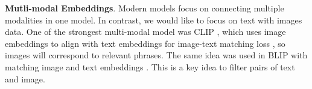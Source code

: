 \documentclass[11pt]{article}
\begin{document}
\textbf{Mutli-modal Embeddings}. Modern models \cite{GATO,kosmos-1,flamingo} focus on connecting multiple modalities in one model. In contrast, we would like to focus on text with images data. One of the strongest multi-modal model was CLIP \cite{Radford-2021}, which uses image embeddings to align with text embeddings for image-text matching loss \cite{contrastive-loss}, so images will correspond to relevant phrases. The same idea was used in BLIP \cite{blip} with matching image and text embeddings \cite{ALBEF}. This is a key idea to filter pairs of text and image.%
\begin{comment}
One of the first multi-modal model was the VisualBERT \cite{vis-bert}, which combines the transformer-based language model with a vision encoder to capture the textual and visual information jointly. Similarly, the LXMERT model \cite{lxmert} incorporates a language encoder and a vision encoder, which can perform joint multi-modal learning on large-scale datasets. The most recent models, such as GATO \cite{GATO}, Kosmos-1 \cite{kosmos-1} are incorporating visual information with passing image through encoder that outputs an embedding that is a great source of information for language model. The same approach was also applied with recent work \cite{mm_chat}, which concatenated dialogue context embedding from GPT \cite{gpt} and image embeddings from Faster-RCNN \cite{faster-rcnn} and pass them to GPT decoder. On the other hand, there is a Flamingo \cite{flamingo}, that uses image information not just as embedding passed to language model, but learns perciever block\cite{perciever} between image information and language model, and then passes this information to language model with cross-attention mechanism. BLIP2 \cite{blip2} connects these approaches and uses special block to transform visual embedding and then pass it to the language model input. 

\smallskip

Nevertheless, those models focus on connecting multiple modalities in one model. In contrast, we would like to focus on text with images data. One of the strongest multi-modal model was CLIP \cite{Radford-2021}, which uses image embeddings to align with text embeddings for image-text matching loss \cite{contrastive-loss}, so images will correspond to relevant phrases. The same idea was used in BLIP \cite{blip} with matching image and text embeddings \cite{ALBEF}. This is a key idea to filter pairs of text and image. BLIP actually uses this approach to filter their data and train model on the better samples first.
\end{comment}
\end{document}
